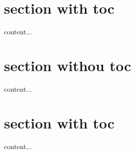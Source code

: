 \documentclass{beamer}
\begin{document}
\section{section with toc}
\begin{frame}
content...
\end{frame}

{
\AtBeginSection[]{}
\section{section withou toc}
\begin{frame}
content...
\end{frame}
}

\section{section with toc}
\begin{frame}
content...
\end{frame}
\end{document}
